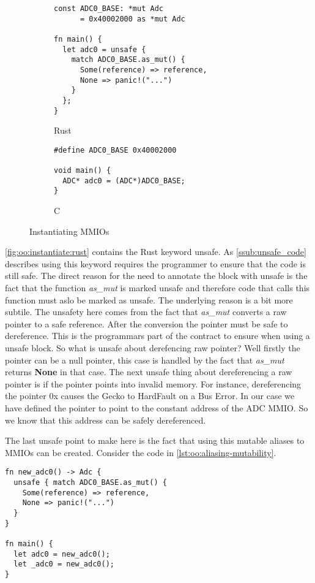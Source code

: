 \begin{figure}[H]

  \begin{subfigure}{0.31\textwidth}
    \begin{verbatim}
const ADC0_BASE: *mut Adc
      = 0x40002000 as *mut Adc

fn main() {
  let adc0 = unsafe {
    match ADC0_BASE.as_mut() {
      Some(reference) => reference,
      None => panic!("...")
    }
  };
}
    \end{verbatim}
    \caption{Rust}
    \label{fig:oo:instantiate:rust}
  \end{subfigure}
  \hfill
  \begin{subfigure}{0.31\textwidth}
    \begin{verbatim}
#define ADC0_BASE 0x40002000

void main() {
  ADC* adc0 = (ADC*)ADC0_BASE;
}
    \end{verbatim}
        \caption{C}
    \label{fig:oo:instantiate:c}
  \end{subfigure}
  \caption{Instantiating MMIOs}
  \label{fig:oo:instantiate}

\end{figure}

\autoref{fig:oo:instantiate:rust} contains the Rust keyword unsafe.
As \autoref{ssub:unsafe_code} describes using this keyword requires the programmer to ensure that the code is still safe.
The direct reason for the need to annotate the block with unsafe is the fact that the function \emph{as\_mut} is marked unsafe and therefore code that calls this function must aslo be marked as unsafe.
The underlying reason is a bit more subtile.
The unsafety here comes from the fact that \emph{as\_mut} converts a raw pointer to a safe reference.
After the conversion the pointer must be safe to dereference.
This is the programmars part of the contract to ensure when using a unsafe block.
So what is unsafe about derefencing raw pointer?
Well firstly the pointer can be a null pointer, this case is handled by the fact that \emph{as\_mut} returns \textbf{None} in that case.
The next unsafe thing about dereferencing a raw pointer is if the pointer points into invalid memory.
For instance, dereferencing the pointer 0x  causes the Gecko to HardFault on a Bus Error.
In our case we have defined the pointer to point to the constant address of the ADC MMIO.
So we know that this address can be safely dereferenced.

The last unsafe point to make here is the fact that using this mutable aliases to MMIOs can be created.
Consider the code in \autoref{lst:oo:aliasing-mutability}.

\begin{listing}[H]
  \begin{verbatim}
fn new_adc0() -> Adc {
  unsafe { match ADC0_BASE.as_mut() {
    Some(reference) => reference,
    None => panic!("...")
  }
}

fn main() {
  let adc0 = new_adc0();
  let _adc0 = new_adc0();
}
  \end{verbatim}
  \caption{}
  \label{lst:oo:aliasing-mutability}
\end{listing}
